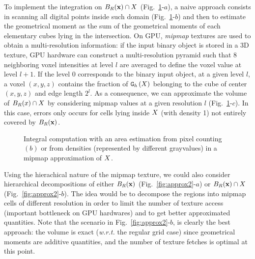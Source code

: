 \documentclass{llncs}
\newcommand{\wrt}{\emph{w.r.t.} }
\begin{document}
To implement the integration on $B_R(\mathbf{x})\cap X$
(Fig.~\ref{fig:approx}-$a$), a naive approach consists in scanning all
digital points inside such domain (Fig.~\ref{fig:approx}-$b$) and then
to estimate the geometrical moment as the sum of the geometrical
moments of each elementary cubes lying in the intersection. On GPU,
\emph{mipmap} textures are used to obtain a multi-resolution information: if the
input binary object is stored in a 3D texture, GPU hardware can
construct a multi-resolution pyramid such that 8 neighboring voxel
intensities at level $l$ are averaged to define the voxel value at
level $l+1$. If the level 0 corresponds to the binary input object, at
a given level $l$, a voxel $(x,y,z)$ contains the fraction of $\mathtt{G}_{h}\left(X\right)$
belonging to the cube of center $(x,y,z)$ and edge length $2^l$. As a
consequence, we can approximate the volume of $B_R(x)\cap X$ by
considering mipmap values at a given resolution $l$
(Fig.~\ref{fig:approx}-$c$). In this case, errors only occurs for
cells lying inside $X$ (with density 1) not entirely covered by
$B_R(\mathbf{x})$.
\begin{figure}
  \begin{center}
  \end{center}
  \caption{Integral computation with an area estimation from pixel
    counting $(b)$ or from densities (represented by different
    grayvalues) in a mipmap approximation of $X$.}
  \label{fig:approx}
\end{figure}

Using the hierachical nature of the mipmap texture, we could also
consider hierarchical decompositions of either $B_R(\mathbf{x})$
(Fig.~\ref{fig:approx2}-$a$) or $B_R(\mathbf{x})\cap X$
(Fig.~\ref{fig:approx2}-$b$). The idea would be to decompose the
regions into mipmap cells of different resolution in order to limit
the number of texture access (important bottleneck on GPU hardwares)
and to get better approximated quantities. Note that the scenario in
Fig.~\ref{fig:approx2}-$b$, is clearly the best approach: the
volume is exact  (\wrt the regular grid case) since geometrical moments
are additive quantities, and the number of texture fetches is  optimal
at this point.
\end{document}
